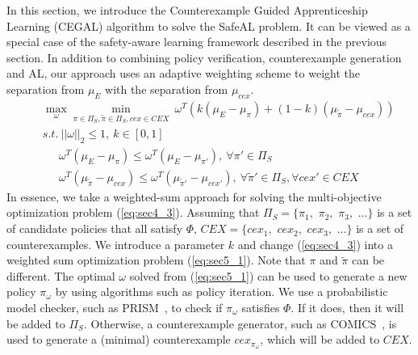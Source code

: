 In this section, we introduce the Counterexample Guided Apprenticeship Learning (CEGAL)
algorithm to solve the SafeAL problem. 
It can be viewed as a special case of the safety-aware learning framework described in the previous section. 
In addition to combining policy verification, counterexample generation and AL, our approach uses an adaptive weighting scheme to weight the separation from $\mu_E$ with the separation from $\mu_{cex}$.
\begin{eqnarray}
&&\underset{\omega}{\max}\underset{\pi\in\Pi_S,\tilde{\pi}\in\Pi_S, cex\in CEX}{\min}\ \omega^T(k(\mu_E - \mu_{\pi})+(1-k)(\mu_{ \tilde{\pi}}  - \mu_{cex}))\label{eq:sec5_1}\\
&&s.t.\: ||\omega||_2\leq 1 \label{eq:sec5_4},\: k\in[0, 1]\label{eq:sec5_5} \nonumber\\ 
&&\quad\ \:\omega^T(\mu_E - \mu_{\pi})\leq\omega^T(\mu_E - \mu_{\pi'}),\ \forall\pi'\in\Pi_S \label{eq:sec5_2} \nonumber\\ 
&&\quad\ \:\omega^T(\mu_{\tilde{\pi}} - \mu_{cex})\leq\omega^T(\mu_{ \tilde{\pi}'} - \mu_{cex'}),\ \forall \tilde{\pi}'\in\Pi_S, \forall cex'\in{CEX} \nonumber
\end{eqnarray}
In essence, we take a weighted-sum approach for solving the multi-objective optimization problem  (\ref{eq:sec4_3}). Assuming that $\Pi_S=\{\pi_{1},$ $\pi_{2},$ $\pi_{3},$ $\ldots \}$ is a set of candidate policies that all satisfy $\Phi$, ${CEX} =\{cex_1,$ $cex_2,$ $cex_3,$ $\ldots\}$ is a set of counterexamples. We introduce a parameter $k$ and change (\ref{eq:sec4_3}) into a weighted sum optimization problem (\ref{eq:sec5_1}). Note that $\pi$ and $\tilde\pi$ can be different. The optimal $\omega$ solved from (\ref{eq:sec5_1}) can be used to generate a new policy $\pi_\omega$ by using algorithms such as policy iteration. 
We use a probabilistic model checker, such as PRISM~\cite{kwiatkowska2002prism}, to check if $\pi_\omega$ satisfies $\Phi$. If it does, then it will be added to $\Pi_S$. Otherwise, a counterexample generator, such as COMICS~\cite{DBLP:journals/corr/abs-1206-0603}, is used to generate a (minimal) counterexample $cex_{\pi_\omega}$, which will be added to ${CEX}$.  

